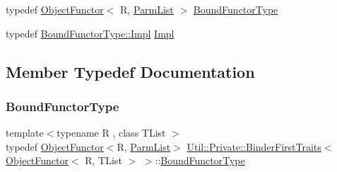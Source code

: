 \begin{DoxyCompactItemize}
\item 
typedef \mbox{\hyperlink{classUtil_1_1ObjectFunctor}{Object\+Functor}}$<$ R, \mbox{\hyperlink{structUtil_1_1Private_1_1BinderFirstTraits_3_01ObjectFunctor_3_01R_00_01TList_01_4_01_4_a181ef1a7b945beef449f25ba47f49bbc}{Parm\+List}} $>$ \mbox{\hyperlink{structUtil_1_1Private_1_1BinderFirstTraits_3_01ObjectFunctor_3_01R_00_01TList_01_4_01_4_af907df4f7fd610d891e8b4eabc0a7c39}{Bound\+Functor\+Type}}
\item 
typedef \mbox{\hyperlink{classUtil_1_1ObjectFunctor_a93fc635194d1d2768e73ba87d03abd8d}{Bound\+Functor\+Type\+::\+Impl}} \mbox{\hyperlink{structUtil_1_1Private_1_1BinderFirstTraits_3_01ObjectFunctor_3_01R_00_01TList_01_4_01_4_a44a122ba86e6d28d35849d5dbea18984}{Impl}}
\end{DoxyCompactItemize}


\subsection{Member Typedef Documentation}
\mbox{\label{structUtil_1_1Private_1_1BinderFirstTraits_3_01ObjectFunctor_3_01R_00_01TList_01_4_01_4_af907df4f7fd610d891e8b4eabc0a7c39}} 
\subsubsection{\texorpdfstring{BoundFunctorType}{BoundFunctorType}\hspace{0.1cm}{\footnotesize\ttfamily [1/3]}}
{\footnotesize\ttfamily template$<$typename R , class T\+List $>$ \\
typedef \mbox{\hyperlink{classUtil_1_1ObjectFunctor}{Object\+Functor}}$<$R, \mbox{\hyperlink{structUtil_1_1Private_1_1BinderFirstTraits_3_01ObjectFunctor_3_01R_00_01TList_01_4_01_4_a181ef1a7b945beef449f25ba47f49bbc}{Parm\+List}}$>$ \mbox{\hyperlink{structUtil_1_1Private_1_1BinderFirstTraits}{Util\+::\+Private\+::\+Binder\+First\+Traits}}$<$ \mbox{\hyperlink{classUtil_1_1ObjectFunctor}{Object\+Functor}}$<$ R, T\+List $>$ $>$\+::\mbox{\hyperlink{structUtil_1_1Private_1_1BinderFirstTraits_3_01ObjectFunctor_3_01R_00_01TList_01_4_01_4_af907df4f7fd610d891e8b4eabc0a7c39}{Bound\+Functor\+Type}}}

